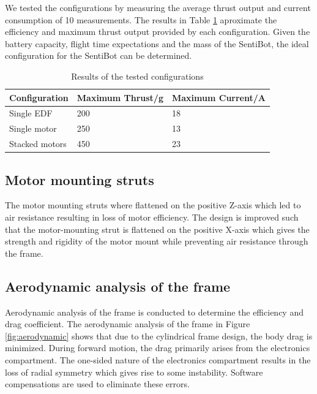 \documentclass[12pt]{article}
\begin{document}
We tested the configurations by measuring the average thrust output and current consumption of 10 measurements. The results in Table \ref{tab:configs} aproximate the efficiency and maximum thrust output provided by each configuration. Given the battery capacity, flight time expectations and the mass of the SentiBot, the ideal configuration for the SentiBot can be determined.

\begin{table}[h]
	\centering
	\begin{tabular}{ | l | l | l | }
		Configuration & Maximum Thrust/g & Maximum Current/A \\
		\hline
		Single EDF & 200 & 18 \\
		Single motor & 250 & 13 \\
		Stacked motors & 450 & 23 \\
	\end{tabular}
	\caption{Results of the tested configurations}
	\label{tab:configs}
\end{table}

\subsection{Motor mounting struts}

The motor mounting struts where flattened on the positive Z-axis which led to air resistance resulting in loss of motor efficiency. The design is improved such that the motor-mounting strut is flattened on the positive X-axis which gives the strength and rigidity of the motor mount while preventing air resistance through the frame.

\subsection{Aerodynamic analysis of the frame}

Aerodynamic analysis of the frame is conducted to determine the efficiency and drag coefficient. The aerodynamic analysis of the frame in Figure \ref{fig:aerodynamic} shows that due to the cylindrical frame design, the body drag is minimized. During forward motion, the drag primarily arises from the electronics compartment. The one-sided nature of the electronics compartment results in the loss of radial symmetry which gives rise to some instability. Software compensations are used to eliminate these errors.
\end{document}
